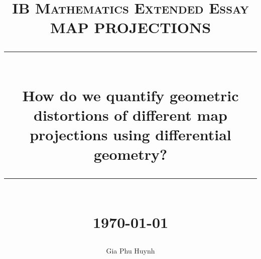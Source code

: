 \documentclass[11pt]{article}
\title{ 
    \normalsize \textsc{IB Mathematics Extended Essay} \\ [2.5cm]

	\LARGE MAP PROJECTIONS
	\rule{\linewidth}{0.5pt} \\
	\Large \textbf{How do we quantify geometric distortions of different map projections using differential geometry?}
	\rule{\linewidth}{1pt} \\ [1cm]
	\normalsize \today \vspace*{5\baselineskip}
}
\date{}
\author{Gia Phu Huynh}
\begin{document}
\maketitle

\pagebreak
\tableofcontents

\pagebreak
\raggedright


\pagebreak
\raggedright

\end{document}
